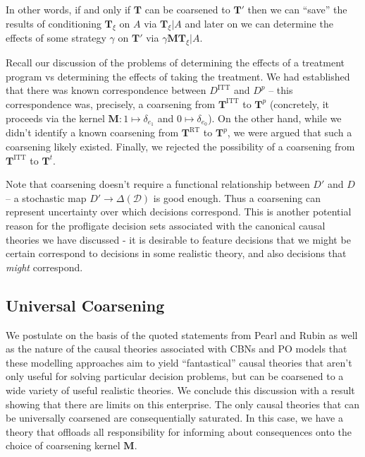 In other words, if and only if $\mathbf{T}$ can be coarsened to $\mathbf{T}'$ then we can ``save'' the results of conditioning $\mathbf{T}_\xi$ on $A$ via $\mathbf{T}_\xi|A$ and later on we can determine the effects of some strategy $\gamma$ on $\mathbf{T}'$ via $\gamma \mathbf{M} \mathbf{T}_\xi|A$.

Recall our discussion of the problems of determining the effects of a treatment program vs determining the effects of taking the treatment. We had established that there was known correspondence between $D^{\mathrm{ITT}}$ and $D^p$ -- this correspondence was, precisely, a coarsening from $\mathbf{T}^{\mathrm{ITT}}$ to $\mathbf{T}^p$ (concretely, it proceeds via the kernel $\mathbf{M}:1\mapsto \delta_{e_1}$ and $0\mapsto \delta_{e_0}$). On the other hand, while we didn't identify a known coarsening from $\mathbf{T}^{\mathrm{RT}}$ to $\mathbf{T}^p$, we were argued that such a coarsening likely existed. Finally, we rejected the possibility of a coarsening from $\mathbf{T}^{\mathrm{ITT}}$ to $\mathbf{T}^t$.

Note that coarsening doesn't require a functional relationship between $D'$ and $D$ -- a stochastic map $D'\to \Delta(\mathcal{D})$ is good enough. Thus a coarsening can represent uncertainty over which decisions correspond. This is another potential reason for the profligate decision sets associated with the canonical causal theories we have discussed - it is desirable to feature decisions that we might be certain correspond to decisions in some realistic theory, and also decisions that \emph{might} correspond.


\subsection{Universal Coarsening}

We postulate on the basis of the quoted statements from Pearl and Rubin as well as the nature of the causal theories associated with CBNs and PO models that these modelling approaches aim to yield ``fantastical'' causal theories that aren't only useful for solving particular decision problems, but can be coarsened to a wide variety of useful realistic theories. We conclude this discussion with a result showing that there are limits on this enterprise. The only causal theories that can be universally coarsened are consequentially saturated. In this case, we have a theory that offloads all responsibility for informing about consequences onto the choice of coarsening kernel $\mathbf{M}$.

